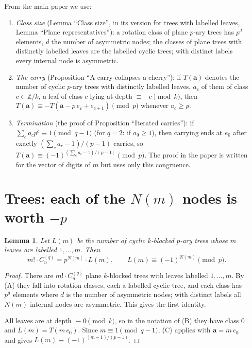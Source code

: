\documentclass[11pt]{article}
\newtheorem{lemma}{Lemma}
\theoremstyle{remark}
\newcommand{\Z}{\mathbb Z}
\newcommand{\C}{C_n^{(q)}}
\begin{document}
From the main paper we use:
\begin{enumerate}[label=(\Alph*)]
\item \emph{Class size} (Lemma ``Class size'', in its version for trees with labelled leaves,
      Lemma ``Plane representatives''): a rotation class of plane $p$-ary trees has $p^{d}$
      elements, $d$ the number of asymmetric nodes; the classes of plane trees with distinctly
      labelled leaves are the labelled cyclic trees; with distinct labels every internal node
      is asymmetric.
\item \emph{The carry} (Proposition ``A carry collapses a cherry''): if $T(\mathbf a)$ denotes
      the number of cyclic $p$-ary trees with distinctly labelled leaves, $a_c$ of them of
      class $c\in\Z/k$, a leaf of class $c$ lying at depth $\equiv-c\pmod k$, then
      $T(\mathbf a)\equiv-T(\mathbf a-p\,e_c+e_{c+1})\pmod p$ whenever $a_c\ge p$.
\item \emph{Termination} (the proof of Proposition ``Iterated carries''): if
      $\sum_c a_cp^c\equiv1\pmod{q-1}$ (for $q=2$: if $a_0\ge1$), then carrying ends at $e_0$
      after exactly $(\sum_ca_c-1)/(p-1)$ carries, so
      $T(\mathbf a)\equiv(-1)^{(\sum_c a_c-1)/(p-1)}\pmod p$. The proof in the paper is written
      for the vector of digits of $m$ but uses only this congruence.
\end{enumerate}

\section{Trees: each of the $N(m)$ nodes is worth $-p$}

\begin{lemma}\label{L1}
Let $L(m)$ be the number of cyclic $k$-blocked $p$-ary trees whose $m$ leaves are labelled
$1,\dots,m$. Then
\[
 m!\cdot\C=p^{N(m)}\cdot L(m),\qquad L(m)\equiv(-1)^{N(m)}\pmod p .
\]
\end{lemma}
\begin{proof}
There are $m!\cdot\C$ plane $k$-blocked trees with leaves labelled $1,\dots,m$. By (A) they
fall into rotation classes, each a labelled cyclic tree, and each class has $p^{d}$ elements
where $d$ is the number of asymmetric nodes; with distinct labels all $N(m)$ internal nodes are
asymmetric. This gives the first identity.

All leaves are at depth $\equiv0\pmod k$, so in the notation of (B) they have class $0$ and
$L(m)=T(m\,e_0)$. Since $m\equiv1\pmod{q-1}$, (C) applies with $\mathbf a=m\,e_0$ and gives
$L(m)\equiv(-1)^{(m-1)/(p-1)}$.
\end{proof}
\end{document}
